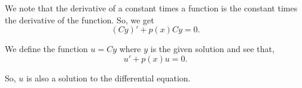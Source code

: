 \documentclass[../hw11]{subfiles}
\begin{document}
We note that the derivative of a constant times a function is the constant times the derivative of the function. So, we get
\[(Cy)'+p(x)Cy=0.\]

We define the function $u=Cy$ where $y$ is the given solution and see that,
\[u'+p(x)u=0.\]

So, $u$ is also a solution to the differential equation.






\end{document}
